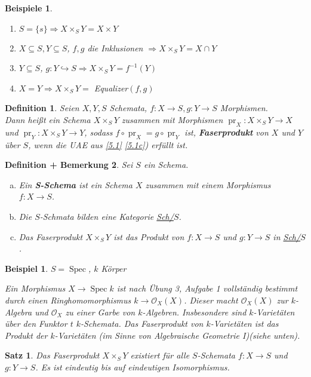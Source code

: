 \documentclass[paper = A4, fontsize=12pt, numbers=noendperiod, chapterprefix=true]{scrbook}
\theoremstyle{break}
\newtheorem{Satz}{Satz}
\newtheorem{Def}{Definition}[section]
\newtheorem{DefBem}[Def]{Definition + Bemerkung}
\theoremstyle{nonumberbreak}
\newtheorem{bsp}{Beispiel}
\newtheorem{bspe}{Beispiele}
\theoremstyle{nonumberplain}
\newcommand{\emp}[1]{\textbf{\emph{#1}}}
\newcommand{\defterm}[1]{{\index{#1}}\emp{#1}}
\newcommand{\deftermspec}[2]{{\index{#2}}\emp{#1}}
\DeclareMathOperator{\Spec}{Spec}
\DeclareMathOperator{\pr}{pr}
\newcommand{\calO}{\mathcal{O}}
\newcommand{\X}{\times}
\begin{document}
\begin{bspe}\begin{enumerate}[1)]
\item
	$S= \{s\} \Rightarrow X \X_S Y = X \X Y$
\item
	$X\subseteq S, Y \subseteq S$, $f,g$ die Inklusionen $\Rightarrow X \X_S Y = X \cap Y$
\item
	$Y \subseteq S$, $g: Y \hookrightarrow S \Rightarrow X \X_S Y = f^{-1}(Y)$
\item
	$X=Y \Rightarrow X \X_S Y =$ Equalizer$(f,g)$
\end{enumerate}\end{bspe}

\begin{Def}
Seien $X, Y, S$ Schemata, $f: X \to S, g: Y \to S$ Morphismen.\\
Dann hei\ss t ein Schema $X \X_S Y$ zusammen mit Morphismen $\pr_X: X \X_S Y \to X$ und $\pr_Y: X \X_S Y \to Y$, sodass $f \circ \pr_X = g\circ \pr_Y$ ist, \defterm{Faserprodukt} von $X$ und $Y$ \"uber $S$, wenn die UAE aus \ref{5.1} \ref{5.1c}) erf\"ullt ist.
\end{Def}

\begin{DefBem}
Sei $S$ ein Schema.\begin{enumerate}[a)]
\item
	Ein \deftermspec{S-Schema}{Schema!$S$-} ist ein Schema $X$ zusammen mit einem Morphismus $f:X \to S$.
\item
	Die $S$-Schmata bilden eine Kategorie \underline{Sch/$S$}.
\item
	Das Faserprodukt $X \X_S Y$ ist das Produkt von $f: X \to S$ und $g: Y \to S$ in \underline{Sch/$S$}.
\end{enumerate}\end{DefBem}

\begin{bsp}
$S = \Spec$, $k$ K\"orper

Ein Morphismus $X \to \Spec k$ ist nach \"Ubung 3, Aufgabe 1 vollst\"andig bestimmt durch einen Ringhomomorphismus $k \to \calO_X(X)$. Dieser macht $\calO_X(X)$ zur $k$-Algebra und $\calO_X$ zu einer Garbe von $k$-Algebren. Insbesondere sind $k$-Variet\"aten \"uber den Funktor $t$ $k$-Schemata. Das Faserprodukt von $k$-Variet\"aten ist das Produkt der $k$-Variet\"aten (im Sinne von Algebraische Geometrie I)(siehe unten).
\end{bsp}

\begin{Satz}
Das Faserprodukt $X \X_S Y$ existiert f\"ur alle $S$-Schemata $f: X \to S$ und $g: Y \to S$. Es ist eindeutig bis auf eindeutigen Isomorphismus.
\end{Satz}
\end{document}
